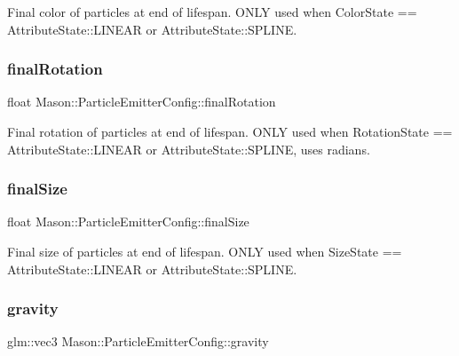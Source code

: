 Final color of particles at end of lifespan. O\+N\+LY used when Color\+State == Attribute\+State\+::\+L\+I\+N\+E\+AR or Attribute\+State\+::\+S\+P\+L\+I\+NE. 

\hypertarget{struct_mason_1_1_particle_emitter_config_a37a579321019d25bdb1ecf4f32353d7c}{}\label{struct_mason_1_1_particle_emitter_config_a37a579321019d25bdb1ecf4f32353d7c} 
\subsubsection{\texorpdfstring{final\+Rotation}{finalRotation}}
{\footnotesize\ttfamily float Mason\+::\+Particle\+Emitter\+Config\+::final\+Rotation}



Final rotation of particles at end of lifespan. O\+N\+LY used when Rotation\+State == Attribute\+State\+::\+L\+I\+N\+E\+AR or Attribute\+State\+::\+S\+P\+L\+I\+NE, uses radians. 

\hypertarget{struct_mason_1_1_particle_emitter_config_a5aabaa7aa8bd203539a56ee269595f94}{}\label{struct_mason_1_1_particle_emitter_config_a5aabaa7aa8bd203539a56ee269595f94} 
\subsubsection{\texorpdfstring{final\+Size}{finalSize}}
{\footnotesize\ttfamily float Mason\+::\+Particle\+Emitter\+Config\+::final\+Size}



Final size of particles at end of lifespan. O\+N\+LY used when Size\+State == Attribute\+State\+::\+L\+I\+N\+E\+AR or Attribute\+State\+::\+S\+P\+L\+I\+NE. 

\hypertarget{struct_mason_1_1_particle_emitter_config_ad5fa0930e4e3f5d8c9de1324a854e63a}{}\label{struct_mason_1_1_particle_emitter_config_ad5fa0930e4e3f5d8c9de1324a854e63a} 
\subsubsection{\texorpdfstring{gravity}{gravity}}
{\footnotesize\ttfamily glm\+::vec3 Mason\+::\+Particle\+Emitter\+Config\+::gravity}



